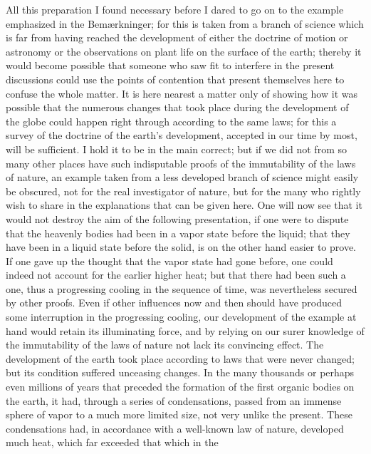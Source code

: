 \documentclass[12pt,a4paper,openany]{book}
\newcommand{\opage}[1]{\marginnote{\footnotesize\textit{[#1]}}}
\begin{document}
\setcounter{footnote}{0}%
\opage{74}All this preparation I found necessary before I dared to go on to the example
emphasized in the Bemærkninger; for this is taken from a branch of science which is
far from having reached the development of either the doctrine of motion or
astronomy or the observations on plant life on the surface of the earth; thereby it
would become possible that someone who saw fit to interfere in the present
discussions could use the points of contention that present themselves here to
confuse the whole matter. It is here nearest a matter only of showing how it was
possible that the numerous changes that took place during the development of the
globe could happen right through according to the same laws; for this a survey of
the doctrine of the earth's development, accepted in our time by most, will be
sufficient. I hold it to be in the main correct; but if we did not from so many other
places have such indisputable proofs of the immutability of the laws of nature, an
example taken from a less developed branch of science might easily be obscured, not
for the real investigator of nature, but for the many who rightly wish to share in
the explanations that can be given here. One will now see that it would not destroy
the aim of the following presentation, if one were to dispute that the heavenly
bodies had been in a vapor state before the liquid; that they have been in a liquid
state before the solid, is on the other hand easier to prove. If one gave up the
thought that the vapor state had gone before, one could indeed not account for the
earlier higher heat; but that there had been such a one, thus a progressing cooling
in the sequence of time, was nevertheless secured by other proofs. Even if other
influences now and then should have produced some interruption in the progressing
cooling, our development of the example at hand would retain its illuminating force,
and by relying on our surer knowledge of the immutability of the laws of nature not
lack its convincing effect. The development of the earth took place according to
laws that were never changed; but its condition suffered unceasing changes.
\setcounter{footnote}{0}%
\opage{75}In the many thousands or perhaps even millions of years that preceded the
formation of the first organic bodies on the earth, it had, through a series of
condensations, passed from an immense sphere of vapor to a much more limited size,
not very unlike the present. These condensations had, in accordance with a
well-known law of nature, developed much heat, which far exceeded that which in the
\end{document}
